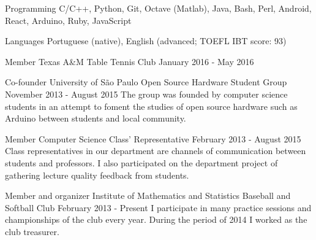 \documentclass[11pt, a4paper]{awesome-cv-res}
\begin{document}
\begin{cvskills}
\cvskill
{Programming} %
{C/C++, Python, Git, Octave (Matlab), Java, Bash, Perl,
Android, React, Arduino, Ruby, JavaScript}

\cvskill
{Languages} %
{Portuguese (native), English (advanced; TOEFL IBT score: 93)} %
\end{cvskills}

\begin{cventries}
\cventry
    {Member\vspace{-3em}}
    {\vspace{-3em}Texas A\&M Table Tennis Club}
{}
{January 2016 - May 2016}
{}

\cventry
{Co-founder}
{University of São Paulo Open Source Hardware Student Group}
{}
{November 2013 - August 2015}
{The group was founded by computer science students in an attempt to 
foment the studies of open source hardware such as Arduino between 
students and local community. }

\cventry
{Member}
{Computer Science Class' Representative}
{}
{February 2013 - August 2015}
{Class representatives in our department are channels of communication
    between students and professors. I also participated on the 
    department project of gathering lecture quality feedback from 
    students.}

\cventry
{Member and organizer}
{Institute of Mathematics and Statistics Baseball and Softball Club}
{}
{February 2013 - Present}
{I participate in many practice sessions and championships of the club 
    every year. During the period of 2014 I worked as the club 
    treasurer.}

\end{cventries}
\end{document}
